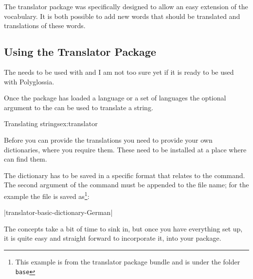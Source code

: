 The translator package was specifically designed to allow an easy
extension of the vocabulary. It is both possible to add new words that
should be translated and translations of these words.

\subsection{Using the Translator Package}

  The  needs to be used with  and I am not too sure yet 
  if it is ready  to be used with Polyglossia.

Once the package has loaded a language or a set of languages the optional argument to the
\cmd{\translate} can be used to translate a string. 

\begin{texexample}{Translating strings}{ex:translator}
\end{texexample}

Before you can provide the translations you need to provide your own dictionaries, where you require them. These need to be installed at a place where \tex can find them.

\CMDI{\ProvidesDictionary}


The dictionary has to be saved in a specific format that relates to the \cmd{\ProvidesDictionary} command. The second argument of the command must be appended to the file name; for the example the file is saved as\footnote{This  example is from the translator package bundle and is under the folder \texttt{base}}:

|translator-basic-dictionary-German|

The concepts take a bit of time to sink in, but once you have everything set up, it is quite easy and straight forward to incorporate it, into your package. 

\begin{teXXX}

\end{teXXX} 


